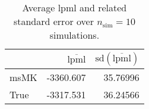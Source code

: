 \begin{table}[H]

\caption{Average lpml and related standard error over $n_{\text{sim}} = 10$ simulations.}
\centering
\begin{tabular}[t]{lrr}
\toprule
  & $\overbar{\text{lpml}}$ & $\text{sd}(\overbar{\text{lpml}})$\\
\midrule
msMK & -3360.607 & 35.76996\\
True & -3317.531 & 36.24566\\
\bottomrule
\end{tabular}
\end{table}